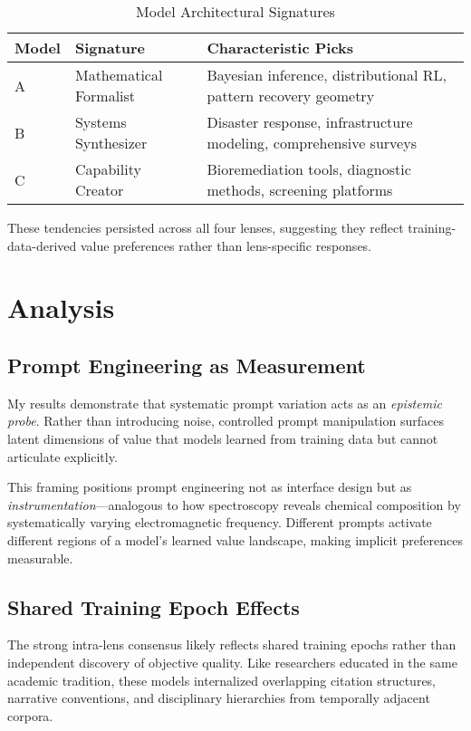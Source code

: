 \documentclass{article}
\begin{document}
\begin{table}[htbp]
\centering
\caption{Model Architectural Signatures}
\label{tab:signatures}
\begin{tabular}{p{1cm}p{2.5cm}p{3.5cm}}
\toprule
\textbf{Model} & \textbf{Signature} & \textbf{Characteristic Picks} \\
\midrule
A & Mathematical Formalist & Bayesian inference, distributional RL, pattern recovery geometry \\
B & Systems Synthesizer & Disaster response, infrastructure modeling, comprehensive surveys \\
C & Capability Creator & Bioremediation tools, diagnostic methods, screening platforms \\
\bottomrule
\end{tabular}
\end{table}

These tendencies persisted across all four lenses, suggesting they reflect training-data-derived value preferences rather than lens-specific responses.

\section{Analysis}

\subsection{Prompt Engineering as Measurement}

My results demonstrate that systematic prompt variation acts as an \textit{epistemic probe}. Rather than introducing noise, controlled prompt manipulation surfaces latent dimensions of value that models learned from training data but cannot articulate explicitly.

This framing positions prompt engineering not as interface design but as \textit{instrumentation}—analogous to how spectroscopy reveals chemical composition by systematically varying electromagnetic frequency. Different prompts activate different regions of a model's learned value landscape, making implicit preferences measurable.

\subsection{Shared Training Epoch Effects}

The strong intra-lens consensus likely reflects shared training epochs rather than independent discovery of objective quality. Like researchers educated in the same academic tradition, these models internalized overlapping citation structures, narrative conventions, and disciplinary hierarchies from temporally adjacent corpora.
\end{document}
